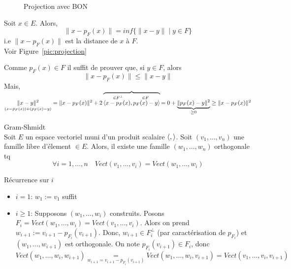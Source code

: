 \begin{figure}[ht]
    \centering
    \caption{Projection avec BON}
    \label{fig:projection-with-bon}
\end{figure}
\begin{prop}
   Soit $x \in E$. Alors,
   \[
       \|x - p_F(x)\| = inf\{\|x - y\| \mid y \in F\}
   \] 
   i.e $\|x - p_F(x)\|$ est la distance de  $x$ à  $F$.\\
   Voir Figure~\ref{pic:projection}
\end{prop}
\begin{preuve}
   Comme $p_F(x) \in F$ il suffit de prouver que, si  $y \in F$, alors 
   \[
   \|x - p_F(x)\| \le \|x - y\|
   \] 
   Mais, $\underset{(x - p_F(x)) + (p_F(x) - y)}{\|x - y\|^2} = \|x - p_F(x)\|^2 + 2\overbrace{\langle \overset{\in F^{\perp}}{x - p_F(x)}, \overset{\in F}{p_F(x) - y} \rangle}{= 0} + \underbrace{\|p_F(x) - y\|^2}_{\ge 0} \ge \|x - p_F(x)\|^2$
\end{preuve}
\begin{theorem}Gram-Shmidt\\
    Soit $E$ un espace vectoriel muni d'un produit scalaire  $\langle , \rangle$. Soit  $(v_1, \ldots, v_n)$ une famille libre d'élement $\in E$. Alors,  il existe une famille $(w_1, \ldots, w_n)$ orthogonale tq 
    \[
        \forall i = 1, \ldots, n \quad Vect(v_1, \ldots, v_i) = Vect(w_1, \ldots, w_i)
    \] 
\end{theorem}
\begin{preuve}
   Récurrence sur $i$\\ 
   \begin{itemize}
       \item $i = 1$:  $w_1 := v_1$ suffit
       \item $i \ge 1$: Supposons $(w_1, \ldots, w_i)$ construits. 
           Posons $F_i = Vect(w_1, \ldots, w_i) = Vect(v_1, \ldots, v_i)$. 
           Alors on prend $w_{i+1} := v_{i+1} - p_{F_i}(v_{i+1})$. 
           Donc,  $w_{i+1} \in F_i^{\perp}$ (par caractérisation de $p_{F_i}$) et $(w_1, \ldots, w_{i+1})$ est orthogonale. On note $p_{F_i}(v_{i+1}) \in F_i$, donc
            \[
                Vect(w_1, \ldots, w_i, w_{i+1}) \underset{w_{i+1} = v_{i+1} - p_{F_i}(v_{i+1})} = Vect(w_1, \ldots, w_i, v_{i+1}) = Vect(v_1, \ldots, v_i, v_{i+1})
           \] 
   \end{itemize}
\end{preuve}
